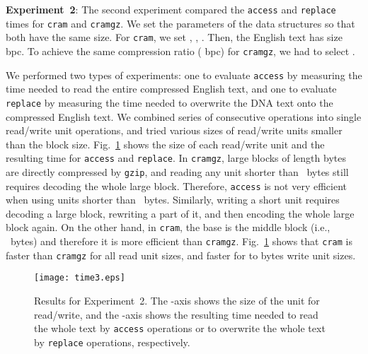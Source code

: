 \documentclass{llncs}
\begin{document}
\medskip

\noindent
\textbf{Experiment~2}:
The second experiment compared the \texttt{access} and \texttt{replace} times
for \texttt{cram} and \texttt{cramgz}.
We set the parameters of the data structures so that both have the same size.
For \texttt{cram}, we set , , .
Then, the English text has size  bpc.
To achieve the same compression ratio ( bpc) for \texttt{cramgz}, we
had to select .

We performed two types of experiments:
one to evaluate \texttt{access} by measuring the time needed to read the
entire compressed English text, and one to evaluate \texttt{replace} by
measuring the time needed to overwrite the DNA text onto the compressed
English text.
We combined series of consecutive operations into single read/write unit
operations, and tried various sizes of read/write units smaller than the
block size.
Fig.~\ref{fig:time} shows the size of each read/write unit and the resulting
time for \texttt{access} and \texttt{replace}.
In \texttt{cramgz}, large blocks of length  bytes are directly
compressed by \texttt{gzip}, and reading any unit shorter than ~bytes
still requires decoding the whole large block.
Therefore, \texttt{access} is not very efficient when using units shorter
than ~bytes.
Similarly, writing a short unit requires decoding a large block, rewriting
a part of it, and then encoding the whole large block again.
On the other hand, in \texttt{cram}, the base is the middle block (i.e.,
~bytes) and therefore it is more efficient than \texttt{cramgz}.
Fig.~\ref{fig:time} shows that \texttt{cram} is faster than \texttt{cramgz}
for all read unit sizes, and faster for  to  bytes write unit sizes.


\begin{figure}[t!]
\begin{center}
  \texttt{[image: time3.eps]}
\caption{Results for Experiment~2.
The -axis shows the size of the unit for read/write, and the -axis
shows the resulting time needed to read the whole text by \texttt{access}
operations or to overwrite the whole text by \texttt{replace} operations,
respectively.}
\label{fig:time}
\end{center}
\end{figure}
\end{document}
